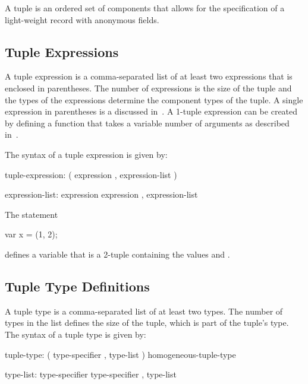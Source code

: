 \label{Tuples}

A tuple is an ordered set of components that allows for the
specification of a light-weight record with anonymous fields.

\subsection{Tuple Expressions}
\label{Tuple_Expressions}

A tuple expression is a comma-separated list of at least two
expressions that is enclosed in parentheses.  The number of
expressions is the size of the tuple and the types of the expressions
determine the component types of the tuple.  A single expression in
parentheses is a  discussed
in~.  A 1-tuple expression can be
created by defining a function that takes a variable number of
arguments as described in~.

The syntax of a tuple expression is given by:
\begin{syntax}
tuple-expression:
  ( expression , expression-list )

expression-list:
  expression
  expression , expression-list
\end{syntax}

\begin{example}
The statement
\begin{chapel}
var x = (1, 2);
\end{chapel}
defines a variable  that is a 2-tuple containing the values
 and .
\end{example}

\subsection{Tuple Type Definitions}
\label{Tuple_Type_Definitions}

A tuple type is a comma-separated list of at least two types.  The
number of types in the list defines the size of the tuple, which is
part of the tuple's type.  The syntax of a tuple type is given by:
\begin{syntax}
tuple-type:
  ( type-specifier , type-list )
  homogeneous-tuple-type

type-list:
  type-specifier
  type-specifier , type-list
\end{syntax}

